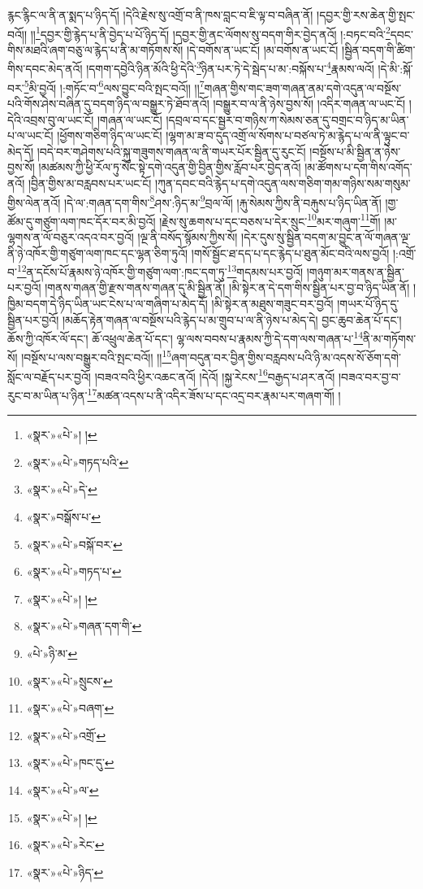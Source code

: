 རྙང་རྙིང་ལ་ནི་ན་སྨད་པ་ཉིད་དོ། །དེའི་རྗེས་སུ་འགྲོ་བ་ནི་ཁས་བླང་བ་ཇི་ལྟ་བ་བཞིན་ནོ། །དབྱར་གྱི་རས་ཆེན་གྱི་སྤང་བའོ།། །།\footnote{«སྣར་»«པེ་»། །}དབྱར་གྱི་རྙེད་པ་ནི་བྱེད་པ་པོ་ཉིད་དོ། །དབྱར་གྱི་ནང་ལོགས་སུ་བདག་གིར་བྱེད་ནའོ། །:བཏང་བའི་\footnote{«སྣར་»«པེ་»གཏད་པའི་}དབང་གིས་མཐའི་ཞག་བཅུ་ལ་རྙེད་པ་ནི་མ་གཏོགས་སོ། །དེ་བགོས་ན་ཡང་ངོ། །མ་བགོས་ན་ཡང་ངོ། །སྦྱིན་བདག་གི་ཚིག་གིས་དབང་མེད་ནའོ། །དགག་དབྱེའི་ཉིན་མོའི་ཕྱི་དེའི་\footnote{«སྣར་»«པེ་»དེ་}ཉིན་པར་ཏེ་དེ་སྦེད་པ་མ་:བསྐོས་པ་\footnote{«སྣར་»བསྒོས་པ་}རྣམས་ལའོ། །དེ་མི་:སྐོ་བར་\footnote{«སྣར་»«པེ་»བསྐོ་བར་}མི་བྱའོ། །:གཏོང་བ་\footnote{«སྣར་»«པེ་»གཏད་པ་}ལས་བྱུང་བའི་སྤང་བའོ།། །།\footnote{«སྣར་»«པེ་»། །}གཞན་གྱིས་གང་ཟག་གཞན་ནམ་དགེ་འདུན་ལ་བསྔོས་པའི་གོས་ཤེས་བཞིན་དུ་བདག་ཉིད་ལ་བསྒྱུར་ཏེ་ཐོབ་ནའོ། །བསྒྱུར་བ་ལ་ནི་ཉེས་བྱས་སོ། །འདིར་གཞན་ལ་ཡང་ངོ། །དེའི་འབྲས་བུ་ལ་ཡང་ངོ། །གཞན་ལ་ཡང་ངོ། །དབྲལ་བ་དང་སྦྱར་བ་གཉིས་ཀ་སེམས་ཅན་དུ་བགྲང་བ་ཉིད་མ་ཡིན་པ་ལ་ཡང་ངོ། །ཕྱོགས་གཅིག་ཉིད་ལ་ཡང་ངོ། །ལྷག་མ་ཟ་བ་དུད་འགྲོ་ལ་སོགས་པ་བཙལ་ཏེ་མ་རྙེད་པ་ལ་ནི་ལྟུང་བ་མེད་དོ། །བདེ་བར་གཤེགས་པའི་སྐུ་གཟུགས་གཞན་ལ་ནི་གཡར་པོར་སྦྱིན་དུ་རུང་ངོ། །བསྔོས་པ་མི་སྦྱིན་ན་ཉེས་བྱས་སོ། །མཚམས་ཀྱི་ཕྱི་རོལ་ཏུ་སོང་སྟེ་དགེ་འདུན་གྱི་བྱིན་གྱིས་རློབ་པར་བྱེད་ནའོ། །མ་ཚོགས་པ་དག་གིས་འགོད་ནའོ། །བྱིན་གྱིས་མ་བརླབས་པར་ཡང་ངོ། །ཀུན་དབང་བའི་རྙེད་པ་དགེ་འདུན་ལས་གཅིག་གམ་གཉིས་སམ་གསུམ་གྱིས་ལེན་ནའོ། །དེ་ལ་:གཞན་དག་གིས་\footnote{«སྣར་»«པེ་»གཞན་དག་གི་}ཤས་:ཉིད་མ་\footnote{«པེ་»ཉི་མ་}བྲལ་ལོ། །རྐུ་སེམས་ཀྱིས་ནི་བརྐུས་པ་ཉིད་ཡིན་ནོ། །གྱ་ཚོམ་དུ་གཙུག་ལག་ཁང་དོར་བར་མི་བྱའོ། །རྗེས་སུ་ཆགས་པ་དང་བཅས་པ་དེར་སྲུང་\footnote{«སྣར་»«པེ་»སྲུངས་}མར་གཞུག་\footnote{«སྣར་»«པེ་»བཞག་}གོ། །མ་ལྷགས་ན་ལོ་བཅུར་འདའ་བར་བྱའོ། །ལྔ་ནི་བསོད་སྙོམས་ཀྱིས་སོ། །དེར་དུས་སུ་སྦྱིན་བདག་མ་བྱུང་ན་ལོ་གཞན་ལྔ་ནི་ཉེ་འཁོར་གྱི་གཙུག་ལག་ཁང་དང་ལྷན་ཅིག་ཏུའོ། །གསོ་སྦྱོང་ཐ་དད་པ་དང་རྙེད་པ་ཐུན་མོང་བའི་ལས་བྱའོ། །:འགྲོ་བ་\footnote{«སྣར་»«པེ་»འགྲོ་}ན་དངོས་པོ་རྣམས་ཉེ་འཁོར་གྱི་གཙུག་ལག་:ཁང་དག་ཏུ་\footnote{«སྣར་»«པེ་»ཁང་དུ་}གདམས་པར་བྱའོ། །གཉུག་མར་གནས་ན་སྦྱིན་པར་བྱའོ། །གནས་གཞན་གྱི་རྫས་གནས་གཞན་དུ་མི་སྦྱིན་ནོ། །མི་སྟེར་ན་དེ་དག་གིས་སྦྱིན་པར་བྱ་བ་ཉིད་ཡིན་ནོ། །ཁྱིམ་བདག་དེ་ཉིད་ཡིན་ཡང་ངེས་པ་ལ་གཞིག་པ་མེད་དོ། །མི་སྟེར་ན་མཐུས་གཟུང་བར་བྱའོ། །གཡར་པོ་ཉིད་དུ་སྦྱིན་པར་བྱའོ། །མཆོད་རྟེན་གཞན་ལ་བསྔོས་པའི་རྙེད་པ་མ་གྲུབ་པ་ལ་ནི་ཉེས་པ་མེད་དེ། བྱང་ཆུབ་ཆེན་པོ་དང་། ཆོས་ཀྱི་འཁོར་ལོ་དང་། ཆོ་འཕྲུལ་ཆེན་པོ་དང་། ལྷ་ལས་བབས་པ་རྣམས་ཀྱི་དེ་དག་ལས་གཞན་པ་\footnote{«སྣར་»«པེ་»ལ་}ནི་མ་གཏོགས་སོ། །བསྔོས་པ་ལས་བསྒྱུར་བའི་སྤང་བའོ།། །།\footnote{«སྣར་»«པེ་»། །}ཞག་བདུན་བར་བྱིན་གྱིས་བརླབས་པའི་ཉི་མ་འདས་སོ་ཅོག་དགེ་སློང་ལ་བརྗོད་པར་བྱའོ། །བཟའ་བའི་ཕྱིར་འཆང་ནའོ། །དེའོ། །སྐྱ་རེངས་\footnote{«སྣར་»«པེ་»རེང་}བརྒྱད་པ་ཤར་ནའོ། །བཟའ་བར་བྱ་བ་རུང་བ་མ་ཡིན་པ་ཉིན་\footnote{«སྣར་»«པེ་»ཉིད་}མཚན་འདས་པ་ནི་འདིར་ཟོས་པ་དང་འདྲ་བར་རྣམ་པར་གཞག་གོ། །
